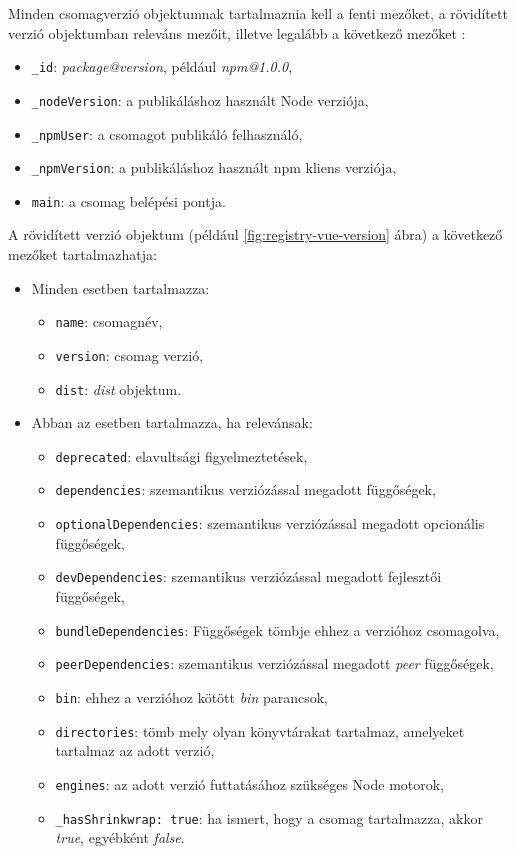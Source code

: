 Minden csomagverzió objektumnak tartalmaznia kell a fenti mezőket, a rövidített verzió objektumban releváns mezőit, illetve legalább a következő mezőket \cite{npm-registry-item}:
 
\begin{itemize}
	\item \texttt{\_id}: \emph{package@version}, például \emph{npm@1.0.0},
	\item \texttt{\_nodeVersion}: a publikáláshoz használt Node verziója,  
	\item \texttt{\_npmUser}: a csomagot publikáló felhasználó,
	\item \texttt{\_npmVersion}: a publikáláshoz használt npm kliens verziója,
	\item \texttt{main}: a csomag belépési pontja.
\end{itemize}

A rövidített verzió objektum (például \ref{fig:registry-vue-version} ábra) a következő mezőket tartalmazhatja:

\begin{itemize}
	\item Minden esetben tartalmazza:
	\begin{itemize}
		\item \texttt{name}: csomagnév,
		\item \texttt{version}: csomag verzió,
		\item \texttt{dist}: \emph{dist} objektum.
	\end{itemize}
	\item Abban az esetben tartalmazza, ha relevánsak:
	\begin{itemize}
		\item \texttt{deprecated}: elavultsági figyelmeztetések,
		\item \texttt{dependencies}: szemantikus verziózással megadott függőségek,
		\item \texttt{optionalDependencies}: szemantikus verziózással megadott opcionális függőségek,
		\item \texttt{devDependencies}: szemantikus verziózással megadott fejlesztői függőségek,
		\item \texttt{bundleDependencies}: Függőségek tömbje ehhez a verzióhoz csomagolva,
		\item \texttt{peerDependencies}: szemantikus verziózással megadott \emph{peer} függőségek,
		\item \texttt{bin}: ehhez a verzióhoz kötött \emph{bin} parancsok,
		\item \texttt{directories}: tömb mely olyan könyvtárakat tartalmaz, amelyeket tartalmaz az adott verzió,
		\item \texttt{engines}: az adott verzió futtatásához szükséges Node motorok,
		\item \texttt{\_hasShrinkwrap: true}: ha ismert, hogy a csomag tartalmazza, akkor \emph{true}, egyébként \emph{false}.
	\end{itemize}
\end{itemize}

